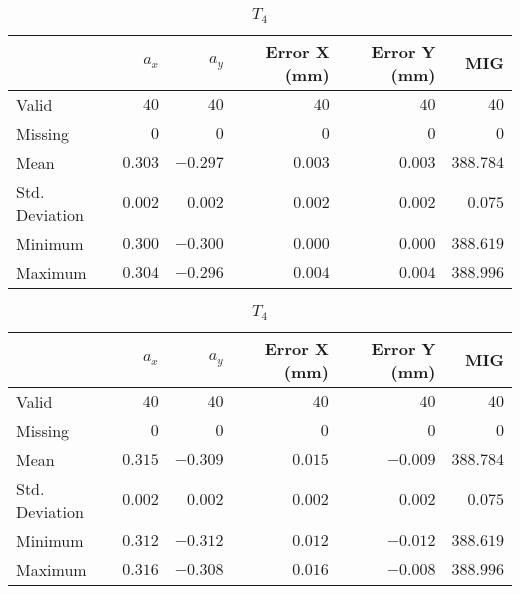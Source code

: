 \begin{table}[h]
    \begin{subtable}{\textwidth}
        \centering
        \footnotesize
        \begin{tabular}{lrrrrr}
            \toprule
                & $a_x$ & $a_y$ & Error X (mm) & Error Y (mm) & MIG  \\
            \midrule
			Valid & $40$ & $40$ & $40$ & $40$ & $40$  \\
			Missing & $0$ & $0$ & $0$ & $0$ & $0$  \\
			Mean & $0.303$ & $-0.297$ & $0.003$ & $0.003$ & $388.784$  \\
			Std. Deviation & $0.002$ & $0.002$ & $0.002$ & $0.002$ & $0.075$  \\
			Minimum & $0.300$ & $-0.300$ & $0.000$ & $0.000$ & $388.619$  \\
			Maximum & $0.304$ & $-0.296$ & $0.004$ & $0.004$ & $388.996$  \\
            \bottomrule
        \end{tabular}
        \caption{$T_3$}
    \end{subtable}

    \vspace{10pt}

    \begin{subtable}{\textwidth}
    \centering
    \footnotesize
    \begin{tabular}{lrrrrr}
        \toprule
        & $a_x$ & $a_y$ & Error X (mm) & Error Y (mm) & MIG  \\
        \midrule
        Valid & $40$ & $40$ & $40$ & $40$ & $40$  \\
        Missing & $0$ & $0$ & $0$ & $0$ & $0$  \\
        Mean & $0.315$ & $-0.309$ & $0.015$ & $-0.009$ & $388.784$  \\
        Std. Deviation & $0.002$ & $0.002$ & $0.002$ & $0.002$ & $0.075$  \\
        Minimum & $0.312$ & $-0.312$ & $0.012$ & $-0.012$ & $388.619$  \\
        Maximum & $0.316$ & $-0.308$ & $0.016$ & $-0.008$ & $388.996$  \\
        \bottomrule
    \end{tabular}
    \caption{$T_4$}
    \end{subtable}

    \vspace{10pt}


\end{table}
